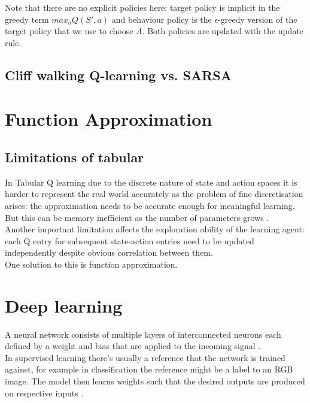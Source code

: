 Note that there are no explicit policies here: target policy is implicit in the greedy term $max_a Q(S', a)$ and behaviour policy is the $\epsilon$-greedy version of the target policy that we use to choose $A$. Both policies are updated with the update rule.

\subsection{Cliff walking  Q-learning vs. SARSA}

\section{Function Approximation}

\subsection{Limitations of tabular}

In Tabular Q learning due to the discrete nature of 
state and action spaces it is harder to represent the real world accurately as the problem of fine discretisation arises: the approximation needs to be accurate enough for meaningful learning. But this can be memory inefficient as the number of parameters grows \cite{lecture_intro_to_deep_rl}. \\

Another important limitation affects the exploration ability of the learning agent: each Q entry for subsequent state-action entries need to be updated independently despite obvious correlation between them.\\

One solution to this is function approximation.

\section{Deep learning}

A neural network consists of multiple layers of interconnected neurons each defined by a weight and bias that are applied to the incoming signal \cite{lecture_intro_to_deep_rl}.\\

In supervised learning there's usually a reference that 
the network is trained against, for example in classification the reference might be a label to an RGB image. The model then learns weights such that the desired outputs are produced on respective inputs \cite{lecture_intro_to_deep_rl} . \\

